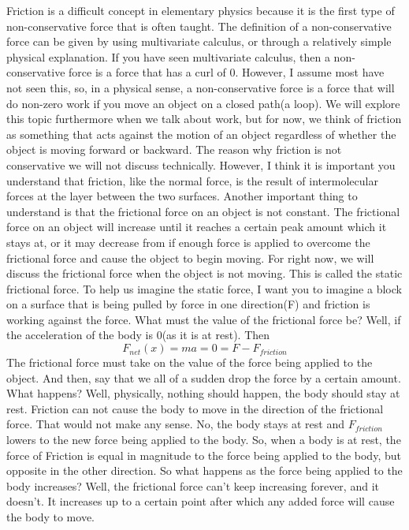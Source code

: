 Friction is a difficult concept in elementary physics because it is the first type of non-conservative force that is often taught. The definition of a non-conservative force can be given by using multivariate calculus, or through a relatively simple physical explanation. If you have seen multivariate calculus, then a non-conservative force is a force that has a curl of 0. However, I assume most have not seen this, so, in a physical sense, a non-conservative force is a force that will do non-zero work if you move an object on a closed path(a loop). We will explore this topic furthermore when we talk about work, but for now, we think of friction as something that acts against the motion of an object regardless of whether the object is moving forward or backward. The reason why friction is not conservative we will not discuss technically. However, I think it is important you understand that friction, like the normal force, is the result of intermolecular forces at the layer between the two surfaces. Another important thing to understand is that the frictional force on an object is not constant. The frictional force on an object will increase until it reaches a certain peak amount which it stays at, or it may decrease from if enough force is applied to overcome the frictional force and cause the object to begin moving. For right now, we will discuss the frictional force when the object is not moving. This is called the static frictional force. To help us imagine the static force, I want you to imagine a block on a surface that is being pulled by force in one direction(F) and friction is working against the force. What must the value of the frictional force be? Well, if the acceleration of the body is 0(as it is at rest). Then  \begin{equation}F_{net}\left(x\right)=ma=0=F-F_{friction}\end{equation} The frictional force must take on the value of the force being applied to the object. And then, say that we all of a sudden drop the force by a certain amount. What happens? Well, physically, nothing should happen, the body should stay at rest. Friction can not cause the body to move in the direction of the frictional force. That would not make any sense. No, the body stays at rest and $F_{friction}$ lowers to the new force being applied to the body. So, when a body is at rest, the force of Friction is equal in magnitude to the force being applied to the body, but opposite in the other direction. So what happens as the force being applied to the body increases? Well, the frictional force can’t keep increasing forever, and it doesn’t. It increases up to a certain point after which any added force will cause the body to move. 


